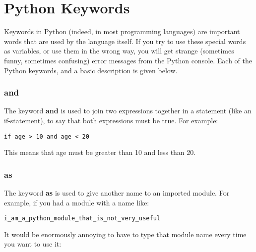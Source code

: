 
\chapter{Python Keywords}\label{app:pythonkeywords}

Keywords in Python (indeed, in most programming languages) are important words that are used by the language itself. If you try to use these special words as variables, or use them in the wrong way, you will get strange (sometimes funny, sometimes confusing) error messages from the Python console.  Each of the Python keywords, and a basic description is given below.

\subsection*{and}

The keyword \textbf{and} is used to join two expressions together in a statement (like an if-statement), to say that both expressions must be true.  For example:

\begin{listing}
\begin{verbatim}
if age > 10 and age < 20
\end{verbatim}
\end{listing}

\noindent
This means that age must be greater than 10 and less than 20.

\subsection*{as}

The keyword \textbf{as} is used to give another name to an imported module. For example, if you had a module with a name like:

\begin{listing}
\begin{verbatim}
i_am_a_python_module_that_is_not_very_useful
\end{verbatim}
\end{listing}

\noindent
It would be enormously annoying to have to type that module name every time you want to use it:

